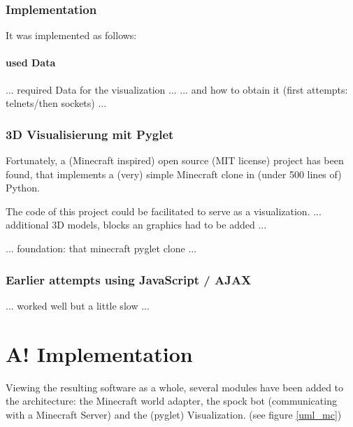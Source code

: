 \subsubsection{Implementation}

It was implemented as follows:



\paragraph{used Data}
... required Data for the visualization ...
... and how to obtain it (first attempts: telnets/then sockets) ...

\subsubsection{3D Visualisierung mit Pyglet}
Fortunately, a (Minecraft inspired) open source (MIT license) project has been found, that implements a (very) simple Minecraft clone in (under 500 lines of) Python.\cite{github_minecraftpython}

The code of this project could be facilitated to serve as a visualization.
... additional 3D models, blocks an graphics had to be added ...

... foundation: that minecraft pyglet clone ...

\subsubsection{Earlier attempts using JavaScript / AJAX}
... worked well but a little slow ...

\section{A! Implementation}

Viewing the resulting software as a whole, several modules have been added to the architecture: the Minecraft world adapter, the spock bot (communicating with a Minecraft Server) and the (pyglet) Visualization. (see figure \ref{uml_mc})

